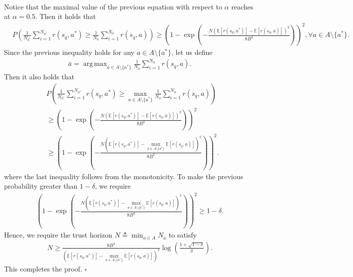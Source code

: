 \documentclass[10pt]{article}
\DeclareMathOperator*{\argmax}{arg\,max}
\newenvironment{myproof}{{\noindent\it Proof. }}{\hfill $\square$ \par}
\def\mbE{{\ensuremath{\mathbb E}}}
\begin{document}
\begin{myproof}
\begin{align}
\end{align}
Notice that the maximal value of the previous equation with respect to $\alpha$ reaches at $\alpha = 0.5$. Then it holds that
\begin{align}
    & P \left( \frac{1}{N_{a^*}}  \sum_{i=1}^{N_{a^*}} r(s_q, a^*) \geq \frac{1}{N_{a}} \sum_{i=1}^{N_{a}}  r(s_q, a) \right)  \geq  \left( 1 - \exp \! \left( - \frac{N \left(\mbE[r(s_q, a^*)] - \mbE[r(s_q, a)] \right)^2}{8 B^2} \right) \right)^2, \forall a \in A \setminus \{a^*\}.
\end{align}
Since the previous inequality holds for any $a \in A \setminus \{a^*\}$, let us define
\begin{align}
    \bar{a} = \argmax_{a \in A \setminus \{a^*\}} \frac{1}{N_{a}} \sum_{i=1}^{N_{a}}  r(s_q, a).
\end{align}
Then it also holds that
\begin{align}
    & P \left( \frac{1}{N_{a^*}}  \sum_{i=1}^{N_{a^*}} r(s_q, a^*) \geq \max_{a \in A \setminus \{a^*\}} \frac{1}{N_{a}} \sum_{i=1}^{N_{a}}  r(s_q, a) \right) \nonumber \\
    &\geq \left( 1 - \exp \left( - \frac{N \left(\mbE[r(s_q, a^*)] - \mbE[r(s_q, \bar{a})] \right)^2}{8 B^2} \right) \right)^2 \\
    &\geq \left( 1 - \exp \left( - \frac{N \left(\mbE[r(s_q, a^*)] - \max_{a \in A \setminus \{a^*\}} \mbE[r(s_q, a)] \right)^2}{8 B^2} \right) \right)^2.
\end{align}
where the last inequality follows from the monotonicity.
To make the previous probability greater than $1-\delta$, we require
\begin{align}
    \left( 1 - \exp \left( - \frac{N \left(\mbE[r(s_q, a^*)] - \max_{a \in A \setminus \{a^*\}} \mbE[r(s_q, a)] \right)^2}{8 B^2} \right) \right)^2 \geq 1-\delta.
\end{align}
Hence, we require the trust horizon $N\triangleq \min_{a \in A}  N_a$ to satisfy
\begin{align}
    N \geq \frac{8B^2}{\left(\mbE[r(s_q, a^*)] - \max_{a \in A \setminus \{a^*\}} \mbE[r(s_q, a)] \right)^2} \log \left( \frac{1+\sqrt{1-\delta}}{\delta} \right).
\end{align}
This completes the proof.
\end{myproof}
\end{document}
